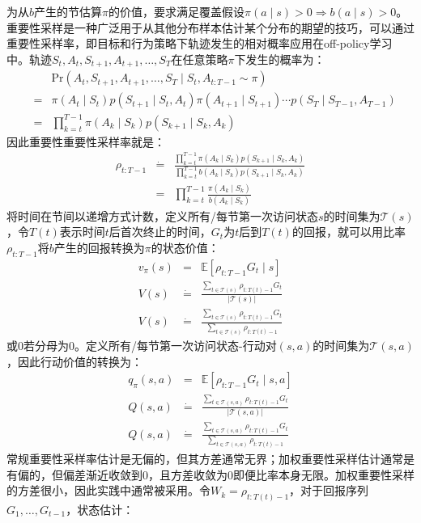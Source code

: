 \documentclass{ctexart}
\begin{document}
为从$b$产生的节估算$\pi$的价值，要求满足覆盖假设$\pi(a\mid s)>0\Rightarrow b(a\mid s)>0$。重要性采样是一种广泛用于从其他分布样本估计某个分布的期望的技巧，可以通过重要性采样率，即目标和行为策略下轨迹发生的相对概率应用在off-policy学习中。轨迹$S_t,A_t,S_{t+1},A_{t+1},\dots,S_T$在任意策略$\pi$下发生的概率为：
\begin{align*}
&&\text{Pr}(A_t,S_{t+1}, A_{t+1},\dots,S_T\mid S_t,A_{t:T-1}\sim\pi)\\
&=& \pi(A_t\mid S_t)p(S_{t+1}\mid S_t,A_t)\pi(A_{t+1}\mid S_{t+1})\cdots p(S_T\mid S_{T-1},A_{T-1})\\
&=& \prod_{k=t}^{T-1}\pi(A_k\mid S_k)p(S_{k+1}\mid S_k,A_k)
\end{align*}
因此重要性重要性采样率就是：
\begin{align*}
\rho_{t:T-1} &\dot=& \frac{\prod_{k=t}^{T-1}\pi(A_k\mid S_k)p(S_{k+1}\mid S_k,A_k)}{\prod_{k=t}^{T-1}b(A_k\mid S_k)p(S_{k+1}\mid S_k,A_k)}\\
&=& \prod_{k=t}^{T-1} \frac{\pi(A_k\mid S_k)}{b(A_k\mid S_k)}
\end{align*}
将时间在节间以递增方式计数，定义所有/每节第一次访问状态$s$的时间集为$\mathcal T(s)$，令$T(t)$表示时间$t$后首次终止的时间，$G_t$为$t$后到$T(t)$的回报，就可以用比率$\rho_{t:T-1}$将$b$产生的回报转换为$\pi$的状态价值：
\begin{align*}
v_\pi(s) &=& \mathbb E[\rho_{t:T-1}G_t \mid s]\\
V(s) &\dot=& \frac{\sum_{t\in\mathcal T(s)}\rho_{t:T(t)-1}G_t}{\vert\mathcal T(s)\vert} \tag{ordinary}\\
V(s) &\dot=& \frac{\sum_{t\in\mathcal T(s)}\rho_{t:T(t)-1}G_t}{\sum_{t\in\mathcal T(s)}\rho_{t:T(t)-1}} \tag{weighted}
\end{align*}
或0若分母为0。定义所有/每节第一次访问状态-行动对$(s,a)$的时间集为$\mathcal T(s,a)$，因此行动价值的转换为：
\begin{align*}
q_\pi(s,a) &=& \mathbb E[\rho_{t:T-1}G_t \mid s,a]\\
Q(s,a) &\dot=& \frac{\sum_{t\in\mathcal T(s,a)}\rho_{t:T(t)-1}G_t}{\vert\mathcal T(s,a)\vert} \tag{ordinary}\\
Q(s,a) &\dot=& \frac{\sum_{t\in\mathcal T(s,a)}\rho_{t:T(t)-1}G_t}{\sum_{t\in\mathcal T(s,a)}\rho_{t:T(t)-1}} \tag{weighted}
\end{align*}
常规重要性采样率估计是无偏的，但其方差通常无界；加权重要性采样估计通常是有偏的，但偏差渐近收敛到0，且方差收敛为0即便比率本身无限。加权重要性采样的方差很小，因此实践中通常被采用。令$W_k=\rho_{t:T(t)-1}$，对于回报序列$G_1,\dots,G_{t-1}$，状态估计：
\end{document}
